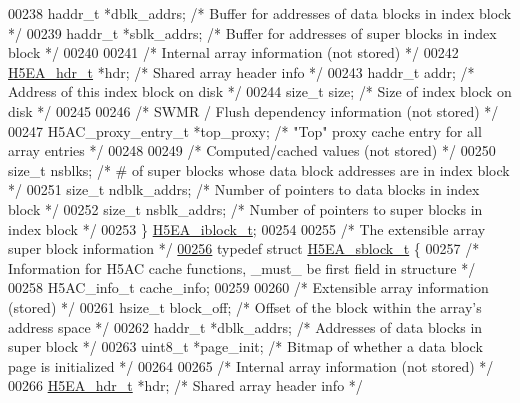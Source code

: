 \begin{DoxyCode}
00238     haddr\_t     *dblk\_addrs;    \textcolor{comment}{/* Buffer for addresses of data blocks in index block */}
00239     haddr\_t     *sblk\_addrs;    \textcolor{comment}{/* Buffer for addresses of super blocks in index block */}
00240 
00241     \textcolor{comment}{/* Internal array information (not stored) */}
00242     \hyperlink{struct_h5_e_a__hdr__t}{H5EA\_hdr\_t}    *hdr;           \textcolor{comment}{/* Shared array header info                     */}
00243     haddr\_t     addr;           \textcolor{comment}{/* Address of this index block on disk          */}
00244     \textcolor{keywordtype}{size\_t}      size;           \textcolor{comment}{/* Size of index block on disk                  */}
00245 
00246     \textcolor{comment}{/* SWMR / Flush dependency information (not stored) */}
00247     H5AC\_proxy\_entry\_t *top\_proxy;      \textcolor{comment}{/* "Top" proxy cache entry for all array entries */}
00248 
00249     \textcolor{comment}{/* Computed/cached values (not stored) */}
00250     \textcolor{keywordtype}{size\_t}      nsblks;         \textcolor{comment}{/* # of super blocks whose data block addresses are in index block */}
00251     \textcolor{keywordtype}{size\_t}      ndblk\_addrs;    \textcolor{comment}{/* Number of pointers to data blocks in index block */}
00252     \textcolor{keywordtype}{size\_t}      nsblk\_addrs;    \textcolor{comment}{/* Number of pointers to super blocks in index block */}
00253 \} \hyperlink{struct_h5_e_a__iblock__t}{H5EA\_iblock\_t};
00254 
00255 \textcolor{comment}{/* The extensible array super block information */}
\hyperlink{struct_h5_e_a__sblock__t}{00256} \textcolor{keyword}{typedef} \textcolor{keyword}{struct }\hyperlink{struct_h5_e_a__sblock__t}{H5EA\_sblock\_t} \{
00257     \textcolor{comment}{/* Information for H5AC cache functions, \_must\_ be first field in structure */}
00258     H5AC\_info\_t cache\_info;
00259 
00260     \textcolor{comment}{/* Extensible array information (stored) */}
00261     hsize\_t     block\_off;      \textcolor{comment}{/* Offset of the block within the array's address space */}
00262     haddr\_t     *dblk\_addrs;    \textcolor{comment}{/* Addresses of data blocks in super block */}
00263     uint8\_t     *page\_init;     \textcolor{comment}{/* Bitmap of whether a data block page is initialized */}
00264 
00265     \textcolor{comment}{/* Internal array information (not stored) */}
00266     \hyperlink{struct_h5_e_a__hdr__t}{H5EA\_hdr\_t}  *hdr;           \textcolor{comment}{/* Shared array header info                     */}

\end{DoxyCode}
